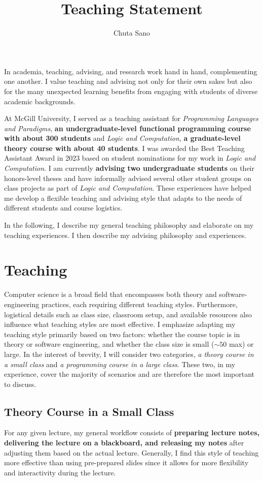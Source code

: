 \documentclass[11pt]{article}
\begin{document}
\title{Teaching Statement}
\author{Chuta Sano}
\maketitle{}

In academia, teaching, advising, and research work hand in hand, complementing one another.
I value teaching and advising not only for their own sakes but also for the many unexpected learning benefits from engaging with students of diverse academic backgrounds.

At McGill University, I served as a teaching assistant for \emph{Programming Languages and Paradigms}, \textbf{an undergraduate-level functional programming course with about 300 students} and \emph{Logic and Computation}, \textbf{a graduate-level theory course with about 40 students}.
I was awarded the Best Teaching Assistant Award in 2023 based on student nominations for my work in \emph{Logic and Computation}.
I am currently \textbf{advising two undergraduate students} on their honors-level theses and have informally advised several other student groups on class projects as part of \emph{Logic and Computation}.
These experiences have helped me develop a flexible teaching and advising style that adapts to the needs of different students and course logistics.

In the following, I describe my general teaching philosophy and elaborate on my teaching experiences. I then describe my advising philosophy and experiences.

\section*{Teaching}
Computer science is a broad field that encompasses both theory and software-engineering practices, each requiring different teaching styles.
Furthermore, logistical details such as class size, classroom setup, and available resources also influence what teaching styles are most effective.
I emphasize adapting my teaching style primarily based on two factors: whether the course topic is in theory or software engineering, and whether the class size is small ($\sim 50$ max) or large.
In the interest of brevity, I will consider two categories, \emph{a theory course in a small class} and \emph{a programming course in a large class}.
These two, in my experience, cover the majority of scenarios and are therefore the most important to discuss.

\subsection*{Theory Course in a Small Class}
For any given lecture, my general workflow consists of \textbf{preparing lecture notes, delivering the lecture on a blackboard, and releasing my notes} after adjusting them based on the actual lecture.
Generally, I find this style of teaching more effective than using pre-prepared slides since it allows for more flexibility and interactivity during the lecture.
\end{document}
